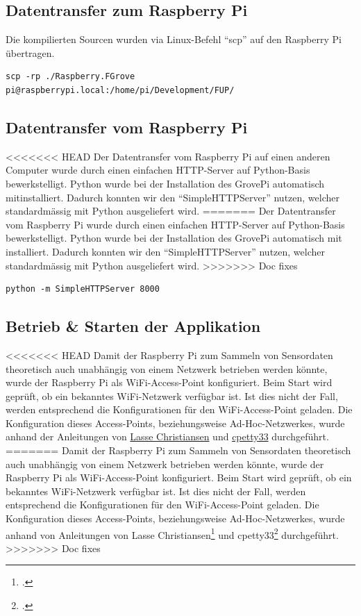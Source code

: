 \subsection{Datentransfer zum Raspberry Pi}
Die kompilierten Sourcen wurden via Linux-Befehl "`scp"' auf den Raspberry Pi übertragen.

\begin{lstlisting}
scp -rp ./Raspberry.FGrove pi@raspberrypi.local:/home/pi/Development/FUP/
\end{lstlisting}

\subsection{Datentransfer vom Raspberry Pi}
<<<<<<< HEAD
Der Datentransfer vom Raspberry Pi auf einen anderen Computer wurde durch einen einfachen HTTP-Server auf Python-Basis bewerkstelligt. Python wurde bei der Installation des GrovePi automatisch mitinstalliert. Dadurch konnten wir den "`SimpleHTTPServer"' nutzen, welcher standardmässig mit Python ausgeliefert wird.
=======
Der Datentransfer vom Raspberry Pi wurde durch einen einfachen HTTP-Server auf Python-Basis bewerkstelligt. Python wurde bei der Installation des GrovePi automatisch mit installiert. Dadurch konnten wir den "`SimpleHTTPServer"' nutzen, welcher standardmässig mit Python ausgeliefert wird.
>>>>>>> Doc fixes

\begin{lstlisting}
python -m SimpleHTTPServer 8000
\end{lstlisting}


\subsection{Betrieb \& Starten der Applikation}
<<<<<<< HEAD
Damit der Raspberry Pi zum Sammeln von Sensordaten theoretisch auch unabhängig von einem Netzwerk betrieben werden könnte, wurde der Raspberry Pi als WiFi-Access-Point konfiguriert. Beim Start wird geprüft, ob ein bekanntes WiFi-Netzwerk verfügbar ist. Ist dies nicht der Fall, werden entsprechend die Konfigurationen für den WiFi-Access-Point geladen. Die Konfiguration dieses Access-Points, beziehungsweise Ad-Hoc-Netzwerkes, wurde anhand der Anleitungen von \hyperlink{http://lcdev.dk/2012/11/18/raspberry-pi-tutorial-connect-to-wifi-or-create-an-encrypted-dhcp-enabled-ad-hoc-network-as-fallback/}{Lasse Christiansen} und \hyperlink{http://slicepi.com/creating-an-ad-hoc-network-for-your-raspberry-pi/}{cpetty33} durchgeführt.
=======
Damit der Raspberry Pi zum Sammeln von Sensordaten theoretisch auch unabhängig von einem Netzwerk betrieben werden könnte, wurde der Raspberry Pi als WiFi-Access-Point konfiguriert. Beim Start wird geprüft, ob ein bekanntes WiFi-Netzwerk verfügbar ist. Ist dies nicht der Fall, werden entsprechend die Konfigurationen für den WiFi-Access-Point geladen. Die Konfiguration dieses Access-Points, beziehungsweise Ad-Hoc-Netzwerkes, wurde anhand von Anleitungen von Lasse Christiansen\footcite{Connect_to_WiFi_2016-06-19} und cpetty33\footcite{Creating_an_Ad-hoc_network_for_your_Raspberry_Pi_2016-06-19} durchgeführt.
>>>>>>> Doc fixes



